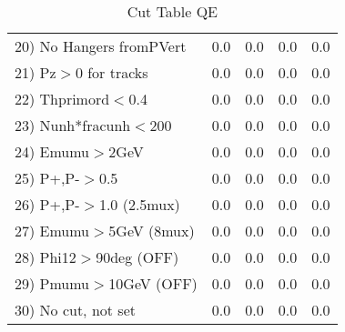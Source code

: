 \begin{table}[h!]
\begin{tabular}{||l||r|r|r|r||}
 20) No Hangers fromPVert &         0.0 &         0.0 &         0.0 &         0.0 \\
 21) Pz$>$0 for tracks    &         0.0 &         0.0 &         0.0 &         0.0 \\
 22) Thprimord$<$0.4      &         0.0 &         0.0 &         0.0 &         0.0 \\
 23) Nunh*fracunh$<$200   &         0.0 &         0.0 &         0.0 &         0.0 \\
 24) Emumu$>$2GeV         &         0.0 &         0.0 &         0.0 &         0.0 \\
 25) P+,P-$>$0.5          &         0.0 &         0.0 &         0.0 &         0.0 \\
 26) P+,P-$>$1.0 (2.5mux) &         0.0 &         0.0 &         0.0 &         0.0 \\
 27) Emumu$>$5GeV  (8mux) &         0.0 &         0.0 &         0.0 &         0.0 \\
 28) Phi12$>$90deg  (OFF) &         0.0 &         0.0 &         0.0 &         0.0 \\
 29) Pmumu$>$10GeV  (OFF) &         0.0 &         0.0 &         0.0 &         0.0 \\
 30) No cut, not set      &         0.0 &         0.0 &         0.0 &         0.0 \\
 \hline
 \hline
 \end{tabular}
 \caption{Cut Table  QE     }
 \label{tab-cut____qe}
 \end{table}
